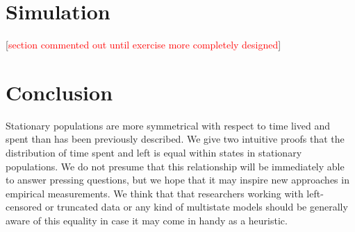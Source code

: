\documentclass[12pt,oneside,a4paper]{article}
\theoremstyle{definition}
\begin{document}
\section{Simulation}
[\textcolor{red}{section commented out until exercise more completely designed}]
% 
% 
% 


\section{Conclusion}
Stationary populations are more symmetrical with respect to time lived and
spent than has been previously described. We give two intuitive proofs that
the distribution of time spent and left is equal within states in
stationary populations. We do not presume that this relationship will be immediately able to answer pressing questions, but we
hope that it may inspire new approaches in empirical measurements. We think
that that researchers working with left-censored or truncated data or
any kind of multistate models should be generally aware of this equality in case
it may come in handy as a heuristic.
\end{document}
